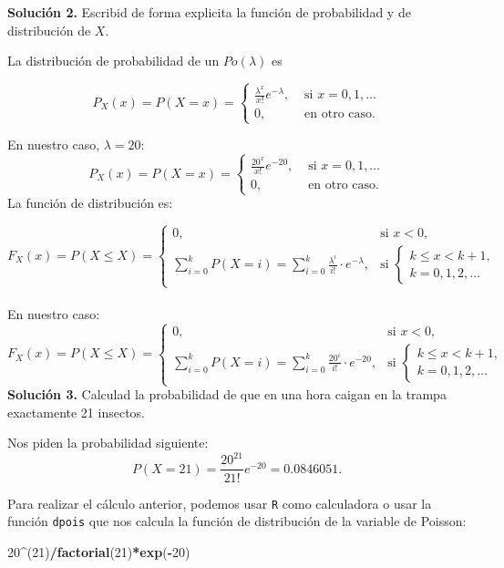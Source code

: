 \documentclass[]{book}
\newenvironment{Shaded}{\begin{snugshade}}{\end{snugshade}}
\newcommand{\DecValTok}[1]{\textcolor[rgb]{0.00,0.00,0.81}{#1}}
\newcommand{\KeywordTok}[1]{\textcolor[rgb]{0.13,0.29,0.53}{\textbf{#1}}}
\newcommand{\NormalTok}[1]{#1}
\newcommand{\OperatorTok}[1]{\textcolor[rgb]{0.81,0.36,0.00}{\textbf{#1}}}
\begin{document}
\textbf{Solución 2.} Escribid de forma explicita la función de probabilidad y de distribución de \(X\).

La distribución de probabilidad de un \(Po(\lambda)\) es

\[
P_X(x)=P(X=x)=\left\{\begin{array}{ll}  \frac{\lambda^x}{x!}e^{-\lambda}, & \mbox{ si } x=0,1,\ldots\\ 0,  & \mbox{ en otro caso.}\end{array}\right.
\]

En nuestro caso, \(\lambda =20\):
\[
P_X(x)=P(X=x)=\left\{\begin{array}{ll}\frac{20^x}{x!}e^{-20}, & \mbox{ si } x=0,1,\ldots\\ 0,  & \mbox{ en otro caso.}\end{array}\right.
\]
La función de distribución es:

\[
F_X(x)=P(X\leq X)=
\left\{\begin{array}{ll} 
0, & \mbox{si } x<0,\\
\displaystyle\sum_{i=0}^{k} P(X=i)=\sum_{i=0}^{k}\frac{\lambda^i}{i!}\cdot e^{-\lambda}, & \mbox{si  }
\left\{\begin{array}{l}
k\leq x< k+1,\\k=0,1,2,\ldots
\end{array}
\right.
\end{array}
\right.
\]\\
En nuestro caso:
\[
F_X(x)=P(X\leq X)=
\left\{\begin{array}{ll} 
0, & \mbox{si } x<0,\\
\displaystyle\sum_{i=0}^{k} P(X=i)=\sum_{i=0}^{k}\frac{20^i}{i!}\cdot e^{-20}, & \mbox{si  }
\left\{\begin{array}{l}
k\leq x< k+1,\\k=0,1,2,\ldots
\end{array}
\right.
\end{array}
\right.
\]
\textbf{Solución 3.} Calculad la probabilidad de que en una hora caigan en la trampa exactamente 21 insectos.

Nos piden la probabilidad siguiente:
\[
P(X=21)=\frac{20^{21}}{21!} e^{-20}=0.0846051.
\]

Para realizar el cálculo anterior, podemos usar \texttt{R} como calculadora o usar la función \texttt{dpois} que nos calcula la función de distribución de la variable de Poisson:

\begin{Shaded}
\begin{Highlighting}[]
\DecValTok{20}\OperatorTok{^}\NormalTok{(}\DecValTok{21}\NormalTok{)}\OperatorTok{/}\KeywordTok{factorial}\NormalTok{(}\DecValTok{21}\NormalTok{)}\OperatorTok{*}\KeywordTok{exp}\NormalTok{(}\OperatorTok{-}\DecValTok{20}\NormalTok{)}
\end{Highlighting}
\end{Shaded}
\end{document}
